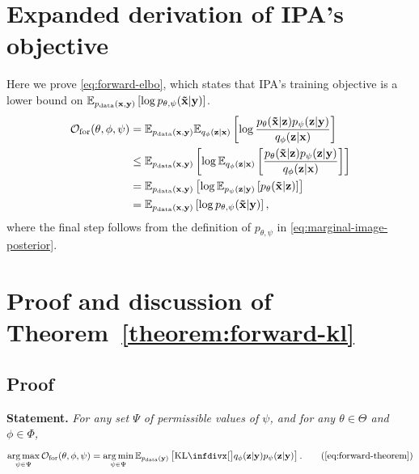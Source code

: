 \section{Expanded derivation of IPA's objective} \label{supp:cigcvae-forward-elbo-bound-deriv}
Here we prove \cref{eq:forward-elbo}, which states that IPA's training
objective is a lower bound on $\mathbb{E}_{p_{\rm{data}} ({\mathbf{x}}, {\mathbf{y}})} \left[ \log
  p_{\theta,\psi}(\mathbf{\tilde{x}}{}|{\mathbf{y}}) \right]$.
\begin{align}
  \mathcal{O}_\mathrm{for}(\theta, \phi, \psi ) &= \mathbb{E}_{p_{\rm{data}} ({\mathbf{x}}, {\mathbf{y}})} \mathbb{E}_{q_\phi({\mathbf{z}}|{\mathbf{x}})} \left[ \log \frac{p_\theta(\mathbf{\tilde{x}}{}|{\mathbf{z}})p_\psi({\mathbf{z}}|{\mathbf{y}})}{q_\phi({\mathbf{z}}|{\mathbf{x}})} \right] \\
                                                   &\leq \mathbb{E}_{p_{\rm{data}} ({\mathbf{x}}, {\mathbf{y}})} \left[ \log \mathbb{E}_{q_\phi({\mathbf{z}}|{\mathbf{x}})} \left[ \frac{p_\theta(\mathbf{\tilde{x}}{}|{\mathbf{z}})p_\psi({\mathbf{z}}|{\mathbf{y}})}{q_\phi({\mathbf{z}}|{\mathbf{x}})} \right]  \right] \\
                                                   &= \mathbb{E}_{p_{\rm{data}} ({\mathbf{x}}, {\mathbf{y}})} \left[ \log \mathbb{E}_{p_\psi({\mathbf{z}}|{\mathbf{y}})} \left[ p_\theta(\mathbf{\tilde{x}}{}|{\mathbf{z}}) \right]  \right] \\
                                                   &= \mathbb{E}_{p_{\rm{data}} ({\mathbf{x}}, {\mathbf{y}})} \left[ \log p_{\theta,\psi}(\mathbf{\tilde{x}}{}|{\mathbf{y}}) \right],
\end{align}
where the final step follows from the definition of $p_{\theta,\psi}$ in
\cref{eq:marginal-image-posterior}.


\section{Proof and discussion of Theorem~\ref{theorem:forward-kl}} \label{proof:forward-kl}
\subsection{Proof}
\textbf{Statement.}
\textit{
  For any set $\Psi$ of
  permissible values of $\psi $, and for any $\theta\in\Theta$ and
  $\phi\in\Phi$,
  \begin{equation}
    \argmax_{\psi  \in \Psi} \mathcal{O}_\mathrm{for}(\theta, \phi, \psi ) = \argmin_{\psi  \in \Psi} \EX_{\pdata (\rvy)} \left[ \kl[\big]{ q_\phi(\rvz|\rvy) }{ p_\psi(\rvz|\rvy) } \right]. \tag{\ref{eq:forward-theorem}}
  \end{equation}
}

